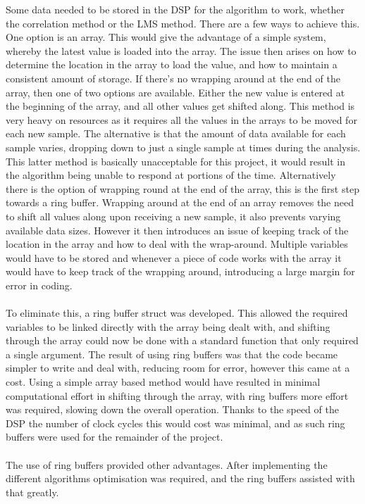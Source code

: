 Some data needed to be stored in the DSP for the algorithm to work, whether the correlation method or the LMS method.
There are a few ways to achieve this.
One option is an array.
This would give the advantage of a simple system, whereby the latest value is loaded into the array.
The issue then arises on how to determine the location in the array to load the value, and how to maintain a consistent amount of storage.
If there's no wrapping around at the end of the array, then one of two options are available.
Either the new value is entered at the beginning of the array, and all other values get shifted along.
This method is very heavy on resources as it requires all the values in the arrays to be moved for each new sample.
The alternative is that the amount of data available for each sample varies, dropping down to just a single sample at times during the analysis.
This latter method is basically unacceptable for this project, it would result in the algorithm being unable to respond at portions of the time.
Alternatively there is the option of wrapping round at the end of the array, this is the first step towards a ring buffer.
Wrapping around at the end of an array removes the need to shift all values along upon receiving a new sample, it also prevents varying available data sizes.
However it then introduces an issue of keeping track of the location in the array and how to deal with the wrap-around.
Multiple variables would have to be stored and whenever a piece of code works with the array it would have to keep track of the wrapping around, introducing a large margin for error in coding.
\\
\\
To eliminate this, a ring buffer struct was developed.
This allowed the required variables to be linked directly with the array being dealt with, and shifting through the array could now be done with a standard function that only required a single argument.
The result of using ring buffers was that the code became simpler to write and deal with, reducing room for error, however this came at a cost.
Using a simple array based method would have resulted in minimal computational effort in shifting through the array, with ring buffers more effort was required, slowing down the overall operation.
Thanks to the speed of the DSP the number of clock cycles this would cost was minimal, and as such ring buffers were used for the remainder of the project.
\\
\\
The use of ring buffers provided other advantages.
After implementing the different algorithms optimisation was required, and the ring buffers assisted with that greatly.
